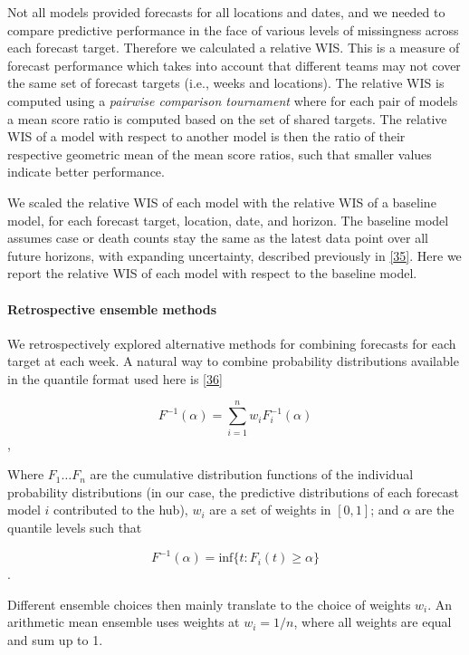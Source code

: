 \documentclass[
]{article}
\begin{document}
Not all models provided forecasts for all locations and dates, and we needed to compare predictive performance in the face of various levels of missingness across each forecast target. Therefore we calculated a relative WIS. This is a measure of forecast performance which takes into account that different teams may not cover the same set of forecast targets (i.e., weeks and locations). The relative WIS is computed using a \emph{pairwise comparison tournament} where for each pair of models a mean score ratio is computed based on the set of shared targets. The relative WIS of a model with respect to another model is then the ratio of their respective geometric mean of the mean score ratios, such that smaller values indicate better performance.

We scaled the relative WIS of each model with the relative WIS of a baseline model, for each forecast target, location, date, and horizon. The baseline model assumes case or death counts stay the same as the latest data point over all future horizons, with expanding uncertainty, described previously in \protect\hyperlink{ref-cramerEvaluationIndividualEnsemble2021}{{[}35{]}}. Here we report the relative WIS of each model with respect to the baseline model.

\hypertarget{retrospective-ensemble-methods}{%
\paragraph{Retrospective ensemble methods}\label{retrospective-ensemble-methods}}

We retrospectively explored alternative methods for combining forecasts for each target at each week. A natural way to combine probability distributions available in the quantile format used here is \protect\hyperlink{ref-genestVincentizationRevisited1992}{{[}36{]}}

\[F^{-1}(\alpha) = \sum_{i=1}^{n}w_i F_i^{-1}(\alpha)\] ,

Where \(F_{1} \ldots F_{n}\) are the cumulative distribution functions of the individual probability distributions (in our case, the predictive distributions of each forecast model \(i\) contributed to the hub), \(w_i\) are a set of weights in \([0,1]\); and \(\alpha\) are the quantile levels such that

\[F^{-1}(\alpha) = \mathrm{inf} \{t : F_i(t) \geq \alpha \}\] .

Different ensemble choices then mainly translate to the choice of weights \(w_i\). An arithmetic mean ensemble uses weights at \(w_i=1/n\), where all weights are equal and sum up to 1.
\end{document}
